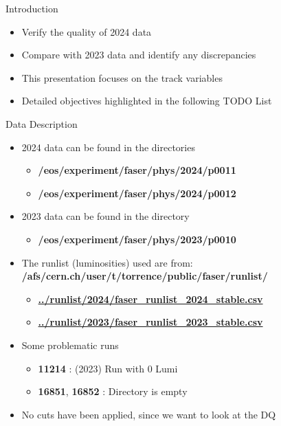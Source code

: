 \begin{frame}{Introduction}
    \begin{itemize}
        \item Verify the quality of 2024 data
        \item Compare with 2023 data and identify any discrepancies
        \item This presentation focuses on the track variables
        \item Detailed objectives highlighted in the following TODO List
    \end{itemize}
\end{frame}

\begin{frame}{Data Description}
    \begin{itemize}
        \item 2024 data can be found in the directories
              \begin{itemize}
                  \item \textbf{/eos/experiment/faser/phys/2024/p0011}
                  \item \textbf{/eos/experiment/faser/phys/2024/p0012}
              \end{itemize}
        \item 2023 data can be found in the directory
              \begin{itemize}
                  \item \textbf{/eos/experiment/faser/phys/2023/p0010}
              \end{itemize}
        \item The runlist (luminosities) used are from:
              \textbf{/afs/cern.ch/user/t/torrence/public/faser/runlist/}
              \begin{itemize}
                  \item \href{/afs/cern.ch/user/t/torrence/public/faser/runlist/2024/faser_runlist_2024_stable.csv}{\textbf{../runlist/2024/faser\_runlist\_2024\_stable.csv}}
                  \item \href{/afs/cern.ch/user/t/torrence/public/faser/runlist/2023/faser_runlist_2023_stable.csv}{\textbf{../runlist/2023/faser\_runlist\_2023\_stable.csv}}
              \end{itemize}
        \item Some problematic runs
              \begin{itemize}
                  \item \textbf{11214} : (2023) Run with 0 Lumi
                  \item \textbf{16851}, \textbf{16852} : Directory is empty
              \end{itemize}
        \item No cuts have been applied, since we want to look at the DQ
    \end{itemize}
\end{frame}

